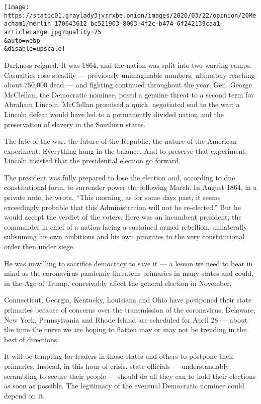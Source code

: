 \texttt{[image: https://static01.graylady3jvrrxbe.onion/images/2020/03/22/opinion/20Meacham1/merlin\_170643612\_bc521903-8003-4f2c-b474-6f242139caa1-articleLarge.jpg?quality=75\\\&auto=webp\\\&disable=upscale]}

Darkness reigned. It was 1864, and the nation was split into two warring
camps. Casualties rose steadily --- previously unimaginable numbers,
ultimately reaching about 750,000 dead --- and fighting continued
throughout the year. Gen. George McClellan, the Democratic nominee,
posed a genuine threat to a second term for Abraham Lincoln. McClellan
promised a quick, negotiated end to the war; a Lincoln defeat would have
led to a permanently divided nation and the preservation of slavery in
the Southern states.

The fate of the war, the future of the Republic, the nature of the
American experiment: Everything hung in the balance. And to preserve
that experiment, Lincoln insisted that the presidential election go
forward.

The president was fully prepared to lose the election and, according to
due constitutional form, to surrender power the following March. In
August 1864, in a private note, he wrote, ``This morning, as for some
days past, it seems exceedingly probable that this Administration will
not be re-elected.'' But he would accept the verdict of the voters. Here
was an incumbent president, the commander in chief of a nation facing a
sustained armed rebellion, unilaterally subsuming his own ambitions and
his own priorities to the very constitutional order then under siege.

He was unwilling to sacrifice democracy to save it --- a lesson we need
to bear in mind as the coronavirus pandemic threatens primaries in many
states and could, in the Age of Trump, conceivably affect the general
election in November.

Connecticut, Georgia, Kentucky, Louisiana and Ohio have postponed their
state primaries because of concerns over the transmission of the
coronavirus. Delaware, New York, Pennsylvania and Rhode Island are
scheduled for April 28 --- about the time the curve we are hoping to
flatten may or may not be trending in the best of directions.

It will be tempting for leaders in those states and others to postpone
their primaries. Instead, in this hour of crisis, state officials ---
understandably scrambling to secure their people --- should do all they
can to hold their elections as soon as possible. The legitimacy of the
eventual Democratic nominee could depend on it.

